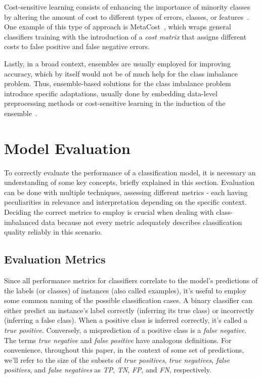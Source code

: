 Cost-sensitive learning consists of enhancing the importance of minority classes by altering the amount of cost to different types of errors, classes, or features~\cite{Vluymans2019a}.
One example of this type of approach is MetaCost~\cite{Domingos1999}, which wraps general classifiers training with the introduction of a \textit{cost matrix} that assigns different costs to false positive and false negative errors.

Lastly, in a broad context, ensembles are usually employed for improving accuracy, which by itself would not be of much help for the class imbalance problem.
Thus, ensemble-based solutions for the class imbalance problem introduce specific adaptations, usually done by embedding data-level preprocessing methods or cost-sensitive learning in the induction of the ensemble~\cite{Vluymans2019a}.


\section{Model Evaluation} \label{sec:model-evaluation}

To correctly evaluate the performance of a classification model, it is necessary an understanding of some key concepts, briefly explained in this section.
Evaluation can be done with multiple techniques, assessing different metrics - each having peculiarities in relevance and interpretation depending on the specific context.
Deciding the correct metrics to employ is crucial when dealing with class-imbalanced data because not every metric adequately describes classification quality reliably in this scenario.

\subsection{Evaluation Metrics}\label{subsec:evaluation_metrics}

Since all performance metrics for classifiers correlate to the model's predictions of the labels (or classes) of instances (also called examples), it's useful to employ some common naming of the possible classification cases.
A binary classifier can either predict an instance's label correctly (inferring its true class) or incorrectly (inferring a false class).
When a positive class is inferred correctly, it's called a \textit{true positive}.
Conversely, a misprediction of a positive class is a \textit{false negative}.
The terms \textit{true negative} and \textit{false positive} have analogous definitions.
For convenience, throughout this paper, in the context of some set of predictions, we'll refer to the size of the subsets of \textit{true positives}, \textit{true negatives}, \textit{false positives}, and \textit{false negatives} as \textit{TP}, \textit{TN}, \textit{FP}, and \textit{FN}, respectively.

